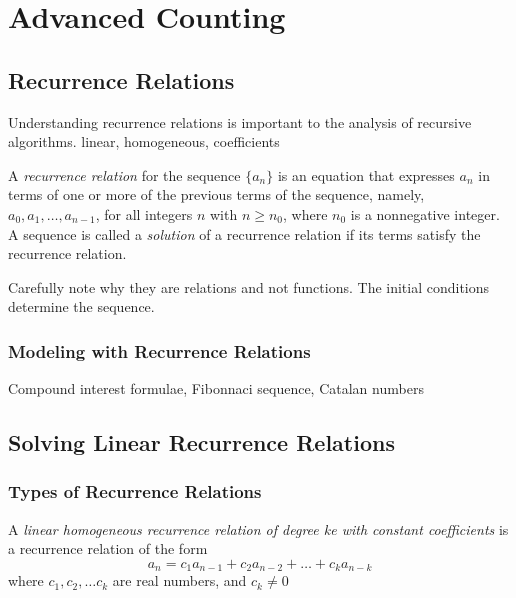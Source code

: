 

                                                                                   


\chapter {Advanced Counting}
\section {Recurrence Relations}
Understanding recurrence relations is important to the analysis of recursive algorithms. 
linear, homogeneous, coefficients

\begin{definition}
A \textit{recurrence relation} for the sequence $\{a_n\}$ is an equation that expresses $a_n$ in terms of one or more of the previous terms of the sequence, namely, $a_0,a_1, \dots ,a_{n-1}$, for all integers $n$ with $n \ge n_0$, where $n_0$ is a nonnegative integer. A sequence is called a \textit{solution} of a recurrence relation if its terms satisfy the recurrence relation.
\end{definition}

\begin{notes}
Carefully note why they are relations and not functions. The initial conditions determine the sequence.
\end{notes}

    \subsection {Modeling with Recurrence Relations}
Compound interest formulae, Fibonnaci sequence, Catalan numbers
    
\section {Solving Linear Recurrence Relations}
  \subsection {Types of Recurrence Relations}

    \begin{definition}
    A \textit{linear homogeneous recurrence relation of degree ke with constant coefficients} is a recurrence relation of the form
    $$ a_n=c_1a_{n-1} + c_2a_{n-2}+ \dots + c_ka_{n-k}$$
    where $c_1, c_2, \dots c_k$ are real numbers, and $c_k \neq 0$
    
    \end{definition}

